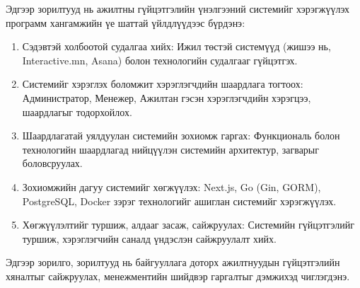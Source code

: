Эдгээр зорилтууд нь ажилтны гүйцэтгэлийн үнэлгээний системийг хэрэгжүүлэх программ хангамжийн үе шаттай үйлдлүүдээс бүрдэнэ:
\begin{enumerate}
    \item Сэдэвтэй холбоотой судалгаа хийх: Ижил төстэй системүүд (жишээ нь, Interactive.mn, Asana) болон технологийн судалгааг гүйцэтгэх.
    \item Системийг хэрэглэх боломжит хэрэглэгчдийн шаардлага тогтоох: Администратор, Менежер, Ажилтан гэсэн хэрэглэгчдийн хэрэгцээ, шаардлагыг тодорхойлох.
    \item Шаардлагатай уялдуулан системийн зохиомж гаргах: Функциональ болон технологийн шаардлагад нийцүүлэн системийн архитектур, загварыг боловсруулах.
    \item Зохиомжийн дагуу системийг хөгжүүлэх: Next.js, Go (Gin, GORM), PostgreSQL, Docker зэрэг технологийг ашиглан системийг хэрэгжүүлэх.
    \item Хөгжүүлэлтийг туршиж, алдааг засаж, сайжруулах: Системийн гүйцэтгэлийг туршиж, хэрэглэгчийн саналд үндэслэн сайжруулалт хийх.
\end{enumerate}

Эдгээр зорилго, зорилтууд нь байгууллага доторх ажилтнуудын гүйцэтгэлийн хяналтыг сайжруулах, менежментийн шийдвэр гаргалтыг дэмжихэд чиглэгдэнэ.
